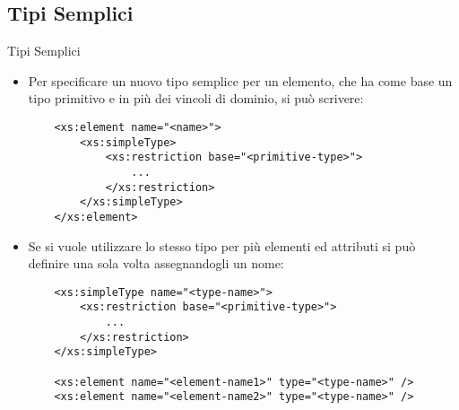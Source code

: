 \documentclass{beamer}
\begin{document}
   \subsection{Tipi Semplici}
   \begin{frame}[containsverbatim]{Tipi Semplici}
   \begin{itemize}
   \item  Per specificare un nuovo tipo semplice per un elemento, che ha come base un tipo primitivo e in più dei vincoli di dominio, si può scrivere:
    \begin{lstlisting}
	<xs:element name="<name>">
  		<xs:simpleType>
    		<xs:restriction base="<primitive-type>">
    			...
    		</xs:restriction>
  		</xs:simpleType>
	</xs:element> 
	\end{lstlisting}
	\end{itemize}
	\end{frame}
	\begin{frame}[containsverbatim]
	\begin{itemize}
	\item Se si vuole utilizzare lo stesso tipo per più elementi ed attributi si può definire una sola volta assegnandogli un nome:
	\begin{lstlisting}
  	<xs:simpleType name="<type-name>">
    	<xs:restriction base="<primitive-type>">
    		...
    	</xs:restriction>
  	</xs:simpleType>
  	
	<xs:element name="<element-name1>" type="<type-name>" /> 
	<xs:element name="<element-name2>" type="<type-name>" /> 
	\end{lstlisting}
	\end{itemize}
	\end{frame}
\end{document}
